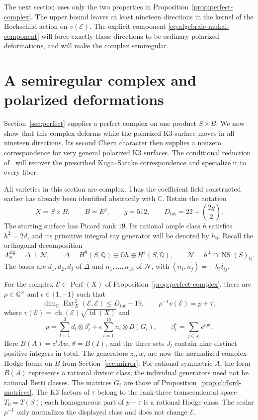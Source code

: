 \documentclass[11pt]{article}
\numberwithin{equation}{section}
\theoremstyle{definition}
\theoremstyle{remark}
\newcommand{\Q}{\mathbb Q}
\newcommand{\C}{\mathbb C}
\newcommand{\Ext}{\operatorname{Ext}}
\newcommand{\Perf}{\operatorname{Perf}}
\newcommand{\NS}{\operatorname{NS}}
\newcommand{\td}{\operatorname{td}}
\newcommand{\ch}{\operatorname{ch}}
\begin{document}
The next section uses only the two properties in
Proposition~\ref{prop:perfect-complex}.  The upper bound leaves at
least nineteen directions in the kernel of the Hochschild action on
$v(\mathcal E)$.  The explicit component
\eqref{eq:algebraic-mukai-component} will force exactly those
directions to be ordinary polarized deformations, and will make the
complex semiregular.


\section{A semiregular complex and polarized deformations}
\label{sec:deformation}

Section~\ref{sec:perfect} supplies a perfect complex on one product
$S\times B$. We now show that this complex deforms while the polarized
K3 surface moves in all nineteen directions. Its second Chern character
then supplies a nonzero correspondence for very general polarized K3
surfaces. The conditional reduction of~\cite{R} will recover the
prescribed Kuga--Satake correspondence and specialize it to every fiber.

All varieties in this section are complex. Thus the coefficient field
constructed earlier has already been identified abstractly with $\C$.
Retain the notation
\[
 X=S\times B,\qquad B=E^g,\qquad g=512,\qquad
 D_{\mathrm{tot}}=22+\binom{2g}{2}.
\]
The starting surface has Picard rank $19$. Its rational ample class $h$
satisfies $h^2=2d$, and its primitive integral ray generator will be
denoted by $h_0$. Recall the orthogonal decomposition
\[
 \Lambda_S^{\mathrm{alg}}
 =\Delta\mathbin{\perp}\mathcal N,\qquad
 \Delta=H^0(S,\Q)\oplus\Q h\oplus H^4(S,\Q),\qquad
 \mathcal N=h^\perp\cap\NS(S)_\Q.
\]
The bases are $d_1,d_2,d_3$ of $\Delta$ and $n_1,\ldots,n_{18}$ of
$\mathcal N$, with $(n_i,n_j)=-\lambda_i\delta_{ij}$.

For the complex $\mathcal E\in\Perf(X)$ of
Proposition~\ref{prop:perfect-complex}, there are $\rho\in\Q^\times$ and
$\epsilon\in\{1,-1\}$ such that
\begin{equation}\label{eq:deformation-input}
 \dim_\C\Ext^2_X(\mathcal E,\mathcal E)\le D_{\mathrm{tot}}-19,
 \qquad
 \rho^{-1}v(\mathcal E)=p+\tau,
\end{equation}
where $v(\mathcal E)=\ch(\mathcal E)\sqrt{\td(X)}$ and
\begin{equation}\label{eq:deformation-p}
 p=\sum_{l=1}^3d_l\otimes\beta_l^\epsilon
       +\epsilon\sum_{i=1}^{18}n_i\otimes B(G_i),\qquad
 \beta_l^\epsilon=\sum_{j\in J_l}e^{\epsilon j\theta}.
\end{equation}
Here $B(A)=z^tAw$, $\theta=B(I)$, and the three sets $J_l$ contain
nine distinct positive integers in total. The generators $z_i,w_i$
are now the normalized complex Hodge forms on $B$ from
Section~\ref{sec:mirror}. For rational symmetric $A$, the form
$B(A)$ represents a rational divisor class; the individual
generators need not be rational Betti classes. The matrices $G_i$ are those
of Proposition~\ref{prop:clifford-matrices}. The K3 factors of $\tau$
belong to the rank-three transcendental space $T_0=T(S)$; each
homogeneous part of $p+\tau$ is a rational Hodge class. The scalar $\rho^{-1}$
only normalizes the displayed class and does not change $\mathcal E$.
\end{document}
